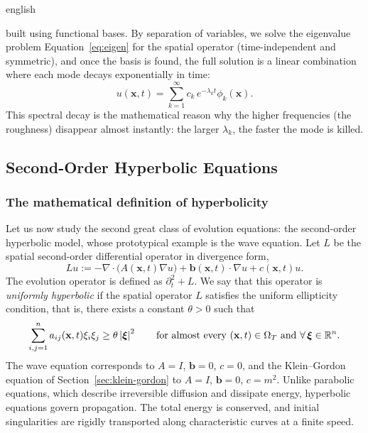 \documentclass[0000.tex]{subfiles}
\begin{document}
\begin{hyphenrules}{english}
\begin{enumerate}
    built using functional bases. By separation of variables, we solve the eigenvalue problem
    Equation~\eqref{eq:eigen} for the spatial operator (time-independent and symmetric), and once the basis is
    found, the full solution is a linear combination where each mode decays exponentially in time:
    \begin{equation}
      u(\mathbf{x},t)=\sum_{k=1}^{\infty}c_k\,e^{-\lambda_k t}\phi_k(\mathbf{x}).
      \label{eq:parabolic-modes}
    \end{equation}
    This spectral decay is the mathematical reason why the higher frequencies (the roughness)
    disappear almost instantly: the larger $\lambda_k$, the faster the mode is killed.
\end{enumerate}

\subsection{Second-Order Hyperbolic Equations}\label{subsec:hyperbolic}

\subsubsection{The mathematical definition of hyperbolicity}
Let us now study the second great class of evolution equations: the second-order hyperbolic model,
whose prototypical example is the wave equation. Let $L$ be the spatial second-order differential
operator in divergence form,
\begin{equation}
  Lu:=-\nabla\cdot\big(A(\mathbf{x},t)\nabla u\big)+\mathbf{b}(\mathbf{x},t)\cdot\nabla u+c(\mathbf{x},t)u.
  \label{eq:hyperbolic-op}
\end{equation}
The evolution operator is defined as $\partial_t^2+L$. We say that this operator is \emph{uniformly
hyperbolic} if the spatial operator $L$ satisfies the uniform ellipticity condition, that is, there
exists a constant $\theta>0$ such that
\begin{equation}
  \sum_{i,j=1}^{n}a_{ij}(\mathbf{x},t)\xi_i\xi_j\ge\theta\left\lvert \bm\xi \right\rvert^2\qquad
  \text{for almost every }(\mathbf{x},t)\in\Omega_T\text{ and }\forall\,\bm\xi\in\mathbb{R}^n.
  \label{eq:uniform-hyperbolicity}
\end{equation}
The wave equation corresponds to $A=I$, $\mathbf{b}=0$, $c=0$, and the Klein--Gordon equation of
Section~\ref{sec:klein-gordon} to $A=I$, $\mathbf{b}=0$, $c=m^2$. Unlike parabolic equations, which describe
irreversible diffusion and dissipate energy, hyperbolic equations govern propagation. The total energy is
conserved, and initial singularities are rigidly transported along characteristic curves at a finite
speed.


\end{hyphenrules}
\end{document}
